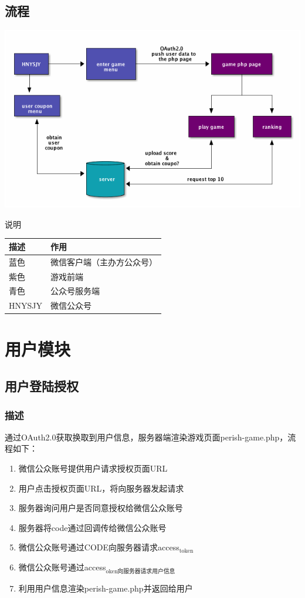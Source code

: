 \documentclass[11pt]{article}
\begin{document}
\subsection{流程}
\label{sec-1-2}

\includegraphics[width=.9\linewidth]{imgs/flowchart.png}

说明
\begin{center}
\begin{tabular}{ll}
描述 & 作用\\
\hline
蓝色 & 微信客户端（主办方公众号）\\
紫色 & 游戏前端\\
青色 & 公众号服务端\\
HNYSJY & 微信公众号\\
\end{tabular}
\end{center}


\section{用户模块\label{user}}
\label{sec-2}
\subsection{用户登陆授权\label{user_login}}
\label{sec-2-1}

\subsubsection{描述}
\label{sec-2-1-1}
通过OAuth2.0获取换取到用户信息，服务器端渲染游戏页面perish-game.php，流程如下：
\begin{enumerate}
\item 微信公众账号提供用户请求授权页面URL
\item 用户点击授权页面URL，将向服务器发起请求
\item 服务器询问用户是否同意授权给微信公众账号
\item 服务器将code通过回调传给微信公众账号
\item 微信公众账号通过CODE向服务器请求access$_{\text{token}}$
\item 微信公众账号通过access$_{\text{oken向服务器请求用户信息}}$
\item 利用用户信息渲染perish-game.php并返回给用户
\end{enumerate}
\end{document}
